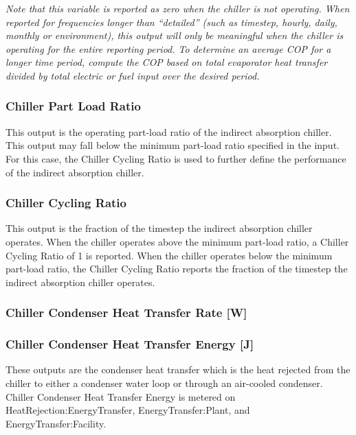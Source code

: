 \emph{Note that this variable is reported as zero when the chiller is not operating. When reported for frequencies longer than ``detailed'' (such as timestep, hourly, daily, monthly or environment), this output will only be meaningful when the chiller is operating for the entire reporting period. To determine an average COP for a longer time period, compute the COP based on total evaporator heat transfer divided by total electric or fuel input over the desired period.}

\subsubsection{Chiller Part Load Ratio}\label{chiller-part-load-ratio}

This output is the operating part-load ratio of the indirect absorption chiller. This output may fall below the minimum part-load ratio specified in the input. For this case, the Chiller Cycling Ratio is used to further define the performance of the indirect absorption chiller.

\subsubsection{Chiller Cycling Ratio}\label{chiller-cycling-ratio}

This output is the fraction of the timestep the indirect absorption chiller operates. When the chiller operates above the minimum part-load ratio, a Chiller Cycling Ratio of 1 is reported. When the chiller operates below the minimum part-load ratio, the Chiller Cycling Ratio reports the fraction of the timestep the indirect absorption chiller operates.

\subsubsection{Chiller Condenser Heat Transfer Rate {[}W{]}}\label{chiller-condenser-heat-transfer-rate-w}

\subsubsection{Chiller Condenser Heat Transfer Energy {[}J{]}}\label{chiller-condenser-heat-transfer-energy-j}

These outputs are the condenser heat transfer which is the heat rejected from the chiller to either a condenser water loop or through an air-cooled condenser. Chiller Condenser Heat Transfer Energy is metered on HeatRejection:EnergyTransfer, EnergyTransfer:Plant, and EnergyTransfer:Facility.

